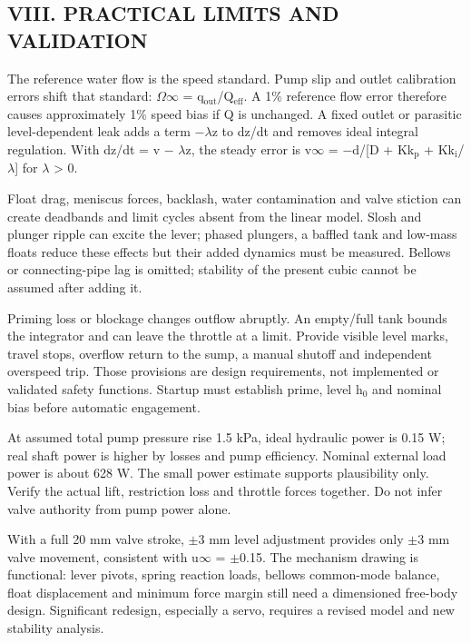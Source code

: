 \documentclass[conference]{IEEEtran}
\begin{document}
\subsection*{VIII. PRACTICAL LIMITS AND VALIDATION}
The reference water flow is the speed standard. Pump slip and outlet calibration errors shift that standard: \ensuremath{\Omega}\ensuremath{\infty} = q\ensuremath{_{\mathrm{out}}}/Q\ensuremath{_{\mathrm{eff}}}. A 1\% reference flow error therefore causes approximately 1\% speed bias if Q is unchanged. A fixed outlet or parasitic level-dependent leak adds a term \ensuremath{-}\ensuremath{\lambda}z to dz/dt and removes ideal integral regulation. With dz/dt = v \ensuremath{-} \ensuremath{\lambda}z, the steady error is v\ensuremath{\infty} = \ensuremath{-}d/[D + Kk\ensuremath{_{\mathrm{p}}} + Kk\ensuremath{_{\mathrm{i}}}/\ensuremath{\lambda}] for \ensuremath{\lambda} > 0.

Float drag, meniscus forces, backlash, water contamination and valve stiction can create deadbands and limit cycles absent from the linear model. Slosh and plunger ripple can excite the lever; phased plungers, a baffled tank and low-mass floats reduce these effects but their added dynamics must be measured. Bellows or connecting-pipe lag is omitted; stability of the present cubic cannot be assumed after adding it.

Priming loss or blockage changes outflow abruptly. An empty/full tank bounds the integrator and can leave the throttle at a limit. Provide visible level marks, travel stops, overflow return to the sump, a manual shutoff and independent overspeed trip. Those provisions are design requirements, not implemented or validated safety functions. Startup must establish prime, level h\ensuremath{{}_0} and nominal bias before automatic engagement.

At assumed total pump pressure rise 1.5 kPa, ideal hydraulic power is 0.15 W; real shaft power is higher by losses and pump efficiency. Nominal external load power is about 628 W. The small power estimate supports plausibility only. Verify the actual lift, restriction loss and throttle forces together. Do not infer valve authority from pump power alone.

With a full 20 mm valve stroke, \ensuremath{\pm}3 mm level adjustment provides only \ensuremath{\pm}3 mm valve movement, consistent with u\ensuremath{\infty} = \ensuremath{\pm}0.15. The mechanism drawing is functional: lever pivots, spring reaction loads, bellows common-mode balance, float displacement and minimum force margin still need a dimensioned free-body design. Significant redesign, especially a servo, requires a revised model and new stability analysis.
\end{document}

